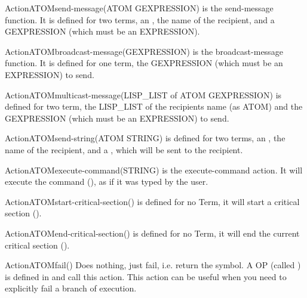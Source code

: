 \begin{typeefa}{Action}{ATOM}{send-message}{(ATOM GEXPRESSION)}
is the send-message function. It is defined for two terms, an , the
name of the recipient, and a GEXPRESSION (which must be an EXPRESSION).
\end{typeefa}

\begin{typeefa}{Action}{ATOM}{broadcast-message}{(GEXPRESSION)}
is the broadcast-message function. It is defined for one term, the
 GEXPRESSION (which must be an EXPRESSION) to send.
\end{typeefa}

\begin{typeefa}{Action}{ATOM}{multicast-message}{(LISP\_LIST of ATOM GEXPRESSION)}
 is defined for two term,  the LISP\_LIST of the recipients name (as ATOM) and
 the GEXPRESSION (which must be an EXPRESSION) to send. 
\end{typeefa}

\begin{typeefa}{Action}{ATOM}{send-string}{(ATOM STRING)}
  is defined for two terms, an , the name of the recipient, and a
  , which will be sent to the recipient.
\end{typeefa}

\begin{typeefa}{Action}{ATOM}{execute-command}{(STRING)} 
is the execute-command action. It will execute the command (), as if it was typed by the user.
\end{typeefa}

\begin{typeefa}{Action}{ATOM}{start-critical-section}{()}
is defined for no Term, it will start a critical section (). 
\end{typeefa}

\begin{typeefa}{Action}{ATOM}{end-critical-section}{()}
is defined for no Term, it will end the current critical section
(). 
\end{typeefa}

\begin{typeefa}{Action}{ATOM}{fail}{()}
Does nothing, just fail, i.e. return the  symbol. A OP (called
) is defined in  and call this action. This
action can be useful when you need to explicitly fail a branch of execution.
\end{typeefa}

